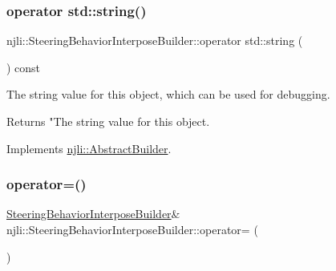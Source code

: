 \subsubsection{\texorpdfstring{operator std\+::string()}{operator std::string()}}
{\footnotesize\ttfamily njli\+::\+Steering\+Behavior\+Interpose\+Builder\+::operator std\+::string (\begin{DoxyParamCaption}{ }\end{DoxyParamCaption}) const\hspace{0.3cm}{\ttfamily [virtual]}}

The string value for this object, which can be used for debugging.

\begin{DoxyReturn}{Returns}
"The string value for this object. 
\end{DoxyReturn}


Implements \mbox{\hyperlink{classnjli_1_1_abstract_builder_a3e6e553e06d1ca30517ad5fb0bd4d000}{njli\+::\+Abstract\+Builder}}.

\mbox{\label{classnjli_1_1_steering_behavior_interpose_builder_a252a00f1a3e50c2f49760b2288159630}} 
\subsubsection{\texorpdfstring{operator=()}{operator=()}}
{\footnotesize\ttfamily \mbox{\hyperlink{classnjli_1_1_steering_behavior_interpose_builder}{Steering\+Behavior\+Interpose\+Builder}}\& njli\+::\+Steering\+Behavior\+Interpose\+Builder\+::operator= (\begin{DoxyParamCaption}\item[{const \mbox{\hyperlink{classnjli_1_1_steering_behavior_interpose_builder}{Steering\+Behavior\+Interpose\+Builder}} \&}]{ }\end{DoxyParamCaption})\hspace{0.3cm}{\ttfamily [protected]}}

\mbox{\label{classnjli_1_1_steering_behavior_interpose_builder_a4927cfcb08181544485f060ea16620b8}} 

